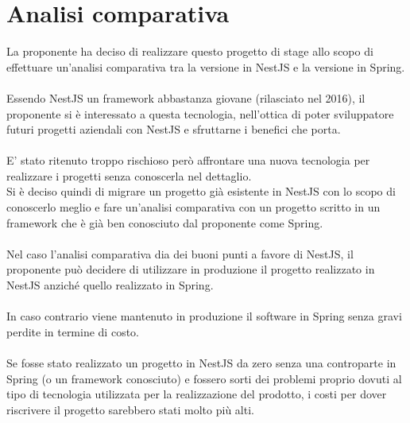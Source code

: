 
\chapter{Analisi comparativa}
\label{cap:analisi-comparativa}

La proponente ha deciso di realizzare questo progetto di stage allo scopo di effettuare 
un'analisi comparativa tra la versione in NestJS e la versione in Spring.
\\\\
Essendo NestJS un framework abbastanza giovane (rilasciato nel 2016), il proponente si 
è interessato a questa tecnologia, nell'ottica di poter sviluppatore futuri progetti 
aziendali con NestJS e sfruttarne i benefici che porta.
\\\\
E' stato ritenuto troppo rischioso però affrontare una nuova tecnologia per realizzare i
progetti senza conoscerla nel dettaglio. 
\\
Si è deciso quindi di migrare un progetto già 
esistente in NestJS con lo scopo di conoscerlo meglio e fare un'analisi comparativa
con un progetto scritto in un framework che è già ben conosciuto dal proponente come Spring.
\\\\
Nel caso l'analisi comparativa dia dei buoni punti a favore di NestJS, il proponente può 
decidere di utilizzare in produzione il progetto realizzato in NestJS anziché quello realizzato
in Spring.
\\\\
In caso contrario viene mantenuto in produzione il software in Spring senza gravi perdite in termine 
di costo.
\\\\
Se fosse stato realizzato un progetto in NestJS da zero senza una controparte in Spring (o un framework conosciuto)
e fossero sorti dei problemi proprio dovuti al tipo di tecnologia utilizzata per la realizzazione del prodotto, i
costi per dover riscrivere il progetto sarebbero stati molto più alti.

